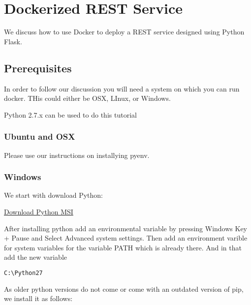 
\section{Dockerized REST Service}
\label{s:docker-flask-rest} 
\FILENAME

We discuss how to use Docker to deploy a REST service designed using
Python Flask.

\subsection{Prerequisites}

In order to follow our discussion you will need a system on which you
can run docker. THis could either be OSX, LInux, or Windows.

\begin{NOTE}
  Python 2.7.x can be used to do this tutorial
\end{NOTE}


\subsubsection{Ubuntu and OSX}

Please use our instructions on installying pyenv.

\subsubsection{Windows}

We start with download Python:

\href{https://www.python.org/ftp/python/2.7.14/python-2.7.14.msi}{Download
Python MSI}

After installing python add an environmental variable by pressing
Windows Key + Pause and Select Advanced system settings. Then add an
environment varible for system variables for the variable PATH which is
already there. And in that add the new variable

\begin{lstlisting}
C:\Python27
\end{lstlisting}

As older python versions do not come or come with an outdated version of
pip, we install it as follows:

